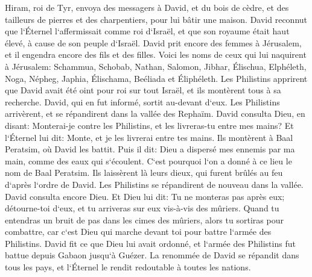 \verse Hiram, roi de Tyr, envoya des messagers à David, et du bois de cèdre, et des tailleurs de pierres et des charpentiers, pour lui bâtir une maison. 
\verse David reconnut que l`Éternel l`affermissait comme roi d`Israël, et que son royaume était haut élevé, à cause de son peuple d`Israël. 
\verse David prit encore des femmes à Jérusalem, et il engendra encore des fils et des filles. 
\verse Voici les noms de ceux qui lui naquirent à Jérusalem: Schammua, Schobab, Nathan, Salomon, 
\verse Jibhar, Élischua, Elphéleth, 
\verse Noga, Népheg, Japhia, 
\verse Élischama, Beéliada et Éliphéleth. 
\verse Les Philistins apprirent que David avait été oint pour roi sur tout Israël, et ils montèrent tous à sa recherche. David, qui en fut informé, sortit au-devant d`eux. 
\verse Les Philistins arrivèrent, et se répandirent dans la vallée des Rephaïm. 
\verse David consulta Dieu, en disant: Monterai-je contre les Philistins, et les livreras-tu entre mes mains? Et l`Éternel lui dit: Monte, et je les livrerai entre tes mains. 
\verse Ils montèrent à Baal Peratsim, où David les battit. Puis il dit: Dieu a dispersé mes ennemis par ma main, comme des eaux qui s`écoulent. C`est pourquoi l`on a donné à ce lieu le nom de Baal Peratsim. 
\verse Ils laissèrent là leurs dieux, qui furent brûlés au feu d`après l`ordre de David. 
\verse Les Philistins se répandirent de nouveau dans la vallée. 
\verse David consulta encore Dieu. Et Dieu lui dit: Tu ne monteras pas après eux; détourne-toi d`eux, et tu arriveras sur eux vis-à-vis des mûriers. 
\verse Quand tu entendras un bruit de pas dans les cimes des mûriers, alors tu sortiras pour combattre, car c`est Dieu qui marche devant toi pour battre l`armée des Philistins. 
\verse David fit ce que Dieu lui avait ordonné, et l`armée des Philistins fut battue depuis Gabaon jusqu`à Guézer. 
\verse La renommée de David se répandit dans tous les pays, et l`Éternel le rendit redoutable à toutes les nations. 

\chapter{}

